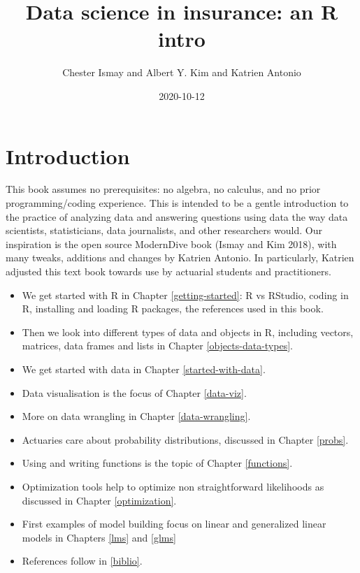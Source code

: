 \documentclass[
]{book}
\title{Data science in insurance: an R intro}
\author{Chester Ismay and Albert Y. Kim and Katrien Antonio}
\date{2020-10-12}
\providecommand{\tightlist}{%
  \setlength{\itemsep}{0pt}\setlength{\parskip}{0pt}}
\begin{document}
\maketitle

{
\setcounter{tocdepth}{1}
\tableofcontents
}
\hypertarget{index}{%
\chapter{Introduction}\label{index}}

This book assumes no prerequisites: no algebra, no calculus, and no prior programming/coding experience. This is intended to be a gentle introduction to the practice of analyzing data and answering questions using data the way data scientists, statisticians, data journalists, and other researchers would. Our inspiration is the open source ModernDive book (Ismay and Kim 2018), with many tweaks, additions and changes by Katrien Antonio. In particularly, Katrien adjusted this text book towards use by actuarial students and practitioners.

\begin{itemize}
\tightlist
\item
  We get started with R in Chapter \ref{getting-started}: R vs RStudio, coding in R, installing and loading R packages, the references used in this book.
\item
  Then we look into different types of data and objects in R, including vectors, matrices, data frames and lists in Chapter \ref{objects-data-types}.
\item
  We get started with data in Chapter \ref{started-with-data}.
\item
  Data visualisation is the focus of Chapter \ref{data-viz}.
\item
  More on data wrangling in Chapter \ref{data-wrangling}.
\item
  Actuaries care about probability distributions, discussed in Chapter \ref{probs}.
\item
  Using and writing functions is the topic of Chapter \ref{functions}.
\item
  Optimization tools help to optimize non straightforward likelihoods as discussed in Chapter \ref{optimization}.
\item
  First examples of model building focus on linear and generalized linear models in Chapters \ref{lms} and \ref{glms}
\item
  References follow in \ref{biblio}.
\end{itemize}
\end{document}
